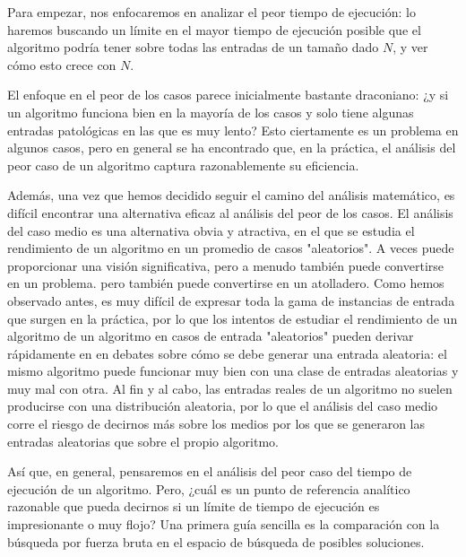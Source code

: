 \documentclass[a4paper, 12pt]{book}
\begin{document}
Para empezar, nos enfocaremos en analizar el peor tiempo de ejecución: lo haremos buscando un límite en el mayor tiempo de ejecución posible que el algoritmo podría tener sobre todas las entradas de un tamaño dado $N$, y ver cómo esto crece con $N$. 

El enfoque en el peor de los casos parece inicialmente bastante draconiano: ¿y si un algoritmo funciona bien en la mayoría de los casos y solo tiene algunas entradas patológicas en las que es muy lento? Esto ciertamente es un problema en algunos casos, pero en general se ha encontrado que, en la práctica, el análisis del peor caso de un algoritmo captura razonablemente su eficiencia.

Además, una vez que hemos decidido seguir el camino del análisis matemático, es difícil encontrar una alternativa eficaz al análisis del peor de los casos. El análisis del caso medio es una alternativa obvia y atractiva, en el que se estudia el rendimiento de un algoritmo en un promedio de casos "aleatorios". A veces puede proporcionar una visión significativa, pero a menudo también puede convertirse en un problema.
pero también puede convertirse en un atolladero. Como hemos observado antes, es muy difícil de expresar toda la gama de instancias de entrada que surgen en la práctica, por lo que los intentos de estudiar el rendimiento de un algoritmo de un algoritmo en casos de entrada "aleatorios" pueden derivar rápidamente en en debates sobre cómo se debe generar una entrada aleatoria: el mismo algoritmo puede funcionar muy bien con una clase de entradas aleatorias y muy mal con otra. Al fin y al cabo, las entradas reales de un algoritmo no suelen producirse con una distribución aleatoria, por lo que el análisis del caso medio corre el riesgo de decirnos más sobre los medios por los que se generaron las entradas aleatorias que sobre el propio algoritmo.

Así que, en general, pensaremos en el análisis del peor caso del tiempo de ejecución de un algoritmo. Pero, ¿cuál es un punto de referencia analítico razonable que pueda decirnos si un límite de tiempo de ejecución es impresionante o muy flojo? Una primera guía sencilla
es la comparación con la búsqueda por fuerza bruta en el espacio de búsqueda de posibles soluciones.
\end{document}
